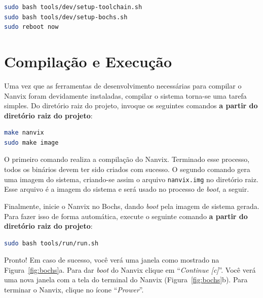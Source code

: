 \documentclass[11pt]{article}
\begin{document}
\begin{lstlisting}[language=bash,numbers=none,frame=single]
sudo bash tools/dev/setup-toolchain.sh
sudo bash tools/dev/setup-bochs.sh
sudo reboot now
\end{lstlisting}

\section{Compilação e Execução}
\label{sec:compilacao}

Uma vez que as ferramentas de desenvolvimento necessárias para compilar o Nanvix foram devidamente instaladas, compilar o sistema torna-se uma tarefa simples. Do diretório raiz do projeto, invoque os seguintes comandos \textbf{a partir do diretório raiz do projeto}:\\

\begin{lstlisting}[language=bash,numbers=none,frame=single]
make nanvix
sudo make image
\end{lstlisting}

O primeiro comando realiza a compilação do Nanvix. Terminado esse processo, todos os binários devem ter sido criados com sucesso. O segundo comando gera uma imagem do sistema, criando-se assim o arquivo \texttt{nanvix.img} no diretório raiz. Esse arquivo é a imagem do sistema e será usado no processo de \textit{boot}, a seguir.

Finalmente, inicie o Nanvix no Bochs, dando \textit{boot} pela imagem de sistema gerada. Para fazer isso de forma automática, execute o seguinte comando \textbf{a partir do diretório raiz do projeto}:\\

\begin{lstlisting}[language=bash,numbers=none,frame=single]
sudo bash tools/run/run.sh
\end{lstlisting}

Pronto! Em caso de sucesso, você verá uma janela como mostrado na Figura~\ref{fig:bochs}a. Para dar \textit{boot} do Nanvix clique em ``\textit{Continue [c]}''. Você verá uma nova janela com a tela do terminal do Nanvix (Figura~\ref{fig:bochs}b). Para terminar o Nanvix, clique no ícone ``\textit{Prower}''.
\end{document}
